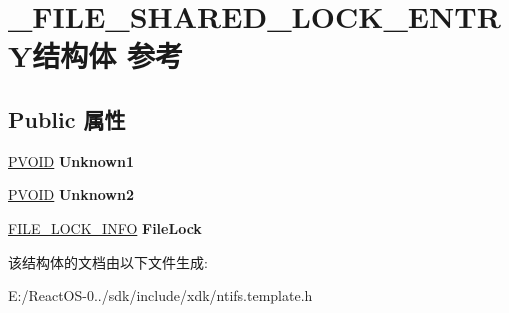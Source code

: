 \hypertarget{struct___f_i_l_e___s_h_a_r_e_d___l_o_c_k___e_n_t_r_y}{}\section{\+\_\+\+F\+I\+L\+E\+\_\+\+S\+H\+A\+R\+E\+D\+\_\+\+L\+O\+C\+K\+\_\+\+E\+N\+T\+R\+Y结构体 参考}
\label{struct___f_i_l_e___s_h_a_r_e_d___l_o_c_k___e_n_t_r_y}
\subsection*{Public 属性}
\begin{DoxyCompactItemize}
\item 
\mbox{\label{struct___f_i_l_e___s_h_a_r_e_d___l_o_c_k___e_n_t_r_y_a6b62b72c6e750c2dfe9759a58c659419}} 
\hyperlink{interfacevoid}{P\+V\+O\+ID} {\bfseries Unknown1}
\item 
\mbox{\label{struct___f_i_l_e___s_h_a_r_e_d___l_o_c_k___e_n_t_r_y_a882f5686f7d637d738f8416bbfdc8083}} 
\hyperlink{interfacevoid}{P\+V\+O\+ID} {\bfseries Unknown2}
\item 
\mbox{\label{struct___f_i_l_e___s_h_a_r_e_d___l_o_c_k___e_n_t_r_y_a80f105452f84be17e490c21fd3ca0dcf}} 
\hyperlink{struct___f_i_l_e___l_o_c_k___i_n_f_o}{F\+I\+L\+E\+\_\+\+L\+O\+C\+K\+\_\+\+I\+N\+FO} {\bfseries File\+Lock}
\end{DoxyCompactItemize}


该结构体的文档由以下文件生成\+:\begin{DoxyCompactItemize}
\item 
E\+:/\+React\+O\+S-\/0../sdk/include/xdk/ntifs.\+template.\+h\end{DoxyCompactItemize}
